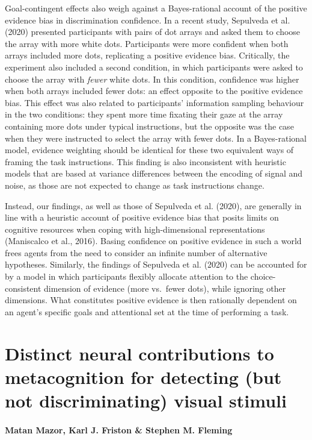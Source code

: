 \documentclass[12pt,twoside]{reedthesis}
\begin{document}
Goal-contingent effects also weigh against a Bayes-rational account of the positive evidence bias in discrimination confidence. In a recent study, Sepulveda et al. (2020) presented participants with pairs of dot arrays and asked them to choose the array with more white dots. Participants were more confident when both arrays included more dots, replicating a positive evidence bias. Critically, the experiment also included a second condition, in which participants were asked to choose the array with \emph{fewer} white dots. In this condition, confidence was higher when both arrays included fewer dots: an effect opposite to the positive evidence bias. This effect was also related to participants' information sampling behaviour in the two conditions: they spent more time fixating their gaze at the array containing more dots under typical instructions, but the opposite was the case when they were instructed to select the array with fewer dots. In a Bayes-rational model, evidence weighting should be identical for these two equivalent ways of framing the task instructions. This finding is also inconsistent with heuristic models that are based at variance differences between the encoding of signal and noise, as those are not expected to change as task instructions change.

Instead, our findings, as well as those of Sepulveda et al. (2020), are generally in line with a heuristic account of positive evidence bias that posits limits on cognitive resources when coping with high-dimensional representations (Maniscalco et al., 2016). Basing confidence on positive evidence in such a world frees agents from the need to consider an infinite number of alternative hypotheses. Similarly, the findings of Sepulveda et al. (2020) can be accounted for by a model in which participants flexibly allocate attention to the choice-consistent dimension of evidence (more vs.~fewer dots), while ignoring other dimensions. What constitutes positive evidence is then rationally dependent on an agent's specific goals and attentional set at the time of performing a task.

\hypertarget{ch:fMRI}{%
\chapter{Distinct neural contributions to metacognition for detecting (but not discriminating) visual stimuli}\label{ch:fMRI}}

\hypertarget{matan-mazor-karl-j.-friston-stephen-m.-fleming}{%
\subsubsection*{Matan Mazor, Karl J. Friston \& Stephen M. Fleming}\label{matan-mazor-karl-j.-friston-stephen-m.-fleming}}
\end{document}
